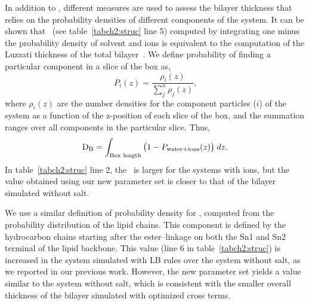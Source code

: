 In addition to \dhh, different measures are used to assess the bilayer thickness 
that relies on the probability densities of different components of the system.
It can be shown that \db~(see table~\ref{tabch2:struc} line 5) computed by integrating one minus
the probability density of solvent and ions is equivalent to the computation of the 
Luzzati thickness of the total bilayer~\cite{fogarty:2015,chiu:2009}.
We define probability of finding a particular component in a slice of the box as,
\begin{equation}
    \label{eq:probability}
    P_{i}(z) = \frac{\rho_i(z)}{\sum^n_{j}\rho_{j}(z)}\text{,}
\end{equation}
where $\rho_{i}(z)$ are the number densities for the 
component particles ($i$) of the system as a function of the 
z-position of each slice of the box, and the summation
ranges over all components in the particular slice.
Thus, 
\begin{equation}
\text{$\text{D}_\text{B}$}=\int_{\text{Box length}}\big(1-P_{\text{water}+\text{ions}}(z)\big)\;dz\text{.}
\end{equation}
In table~\ref{tabch2:struc} line 2, the \db~is larger for the systems
with ions, but the value obtained using our new parameter set is closer to that of
the bilayer simulated without salt.

We use a similar definition of probability density for \dc, 
computed from the probability distribution of the lipid chains. 
This component is defined by the hydrocarbon chains starting after the ester--linkage
on both the Sn1 and Sn2 terminal of the lipid backbone. 
This value (line 6 in table~\ref{tabch2:struc}) is increased in the system simulated
with LB rules over the system without salt, 
as we reported in our previous work. 
However, the new parameter set yields a value similar to the system without salt, 
which is consistent with the smaller overall thickness of the bilayer 
simulated with optimized cross terms.

